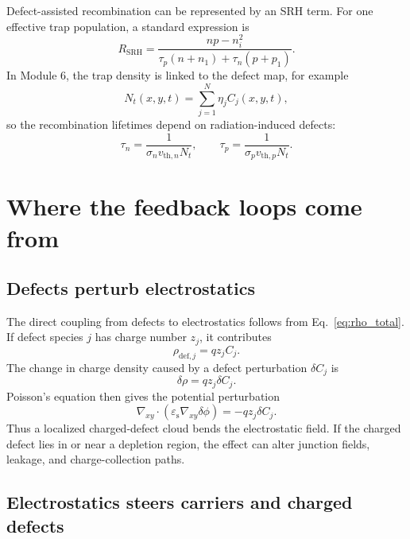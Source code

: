 \documentclass[11pt]{article}
\newcommand{\gradxy}{\nabla_{xy}}
\newcommand{\divxy}{\nabla_{xy}\cdot}
\newcommand{\epss}{\varepsilon_{\mathrm{s}}}
\begin{document}
Defect-assisted recombination can be represented by an SRH term. For one effective trap population, a standard expression is
\begin{equation}
\boxed{
R_{\mathrm{SRH}}
=
\frac{np-n_i^2}
{\tau_p(n+n_1)+\tau_n(p+p_1)}.}
\label{eq:srh}
\end{equation}
In Module 6, the trap density is linked to the defect map, for example
\begin{equation}
N_t(x,y,t)=\sum_{j=1}^{N}\eta_j C_j(x,y,t),
\label{eq:trap_density_from_defects}
\end{equation}
so the recombination lifetimes depend on radiation-induced defects:
\begin{equation}
\tau_n=\frac{1}{\sigma_n v_{\mathrm{th},n}N_t},
\qquad
\tau_p=\frac{1}{\sigma_p v_{\mathrm{th},p}N_t}.
\label{eq:trap_lifetimes}
\end{equation}

\section{Where the feedback loops come from}

\subsection{Defects perturb electrostatics}

The direct coupling from defects to electrostatics follows from Eq.~\eqref{eq:rho_total}. If defect species \(j\) has charge number \(z_j\), it contributes
\begin{equation}
\rho_{\mathrm{def},j}=q z_j C_j.
\end{equation}
The change in charge density caused by a defect perturbation \(\delta C_j\) is
\begin{equation}
\delta \rho = q z_j \delta C_j.
\end{equation}
Poisson's equation then gives the potential perturbation
\begin{equation}
\divxy\left(\epss\gradxy\delta\phi\right)=-qz_j\delta C_j.
\end{equation}
Thus a localized charged-defect cloud bends the electrostatic field. If the charged defect lies in or near a depletion region, the effect can alter junction fields, leakage, and charge-collection paths.

\subsection{Electrostatics steers carriers and charged defects}
\end{document}
